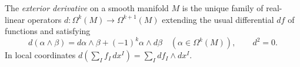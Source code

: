 
The \emph{exterior derivative} on a smooth manifold $M$ is the unique family of real-linear operators $d:\Omega^k(M)\to\Omega^{k+1}(M)$ extending the usual differential $df$ of functions and satisfying
\[
d(\alpha\wedge\beta)=d\alpha\wedge\beta+(-1)^k\alpha\wedge d\beta\quad(\alpha\in\Omega^k(M)),\qquad d^2=0.
\]
In local coordinates $d(\sum_I f_I\,dx^I)=\sum_I df_I\wedge dx^I$.
